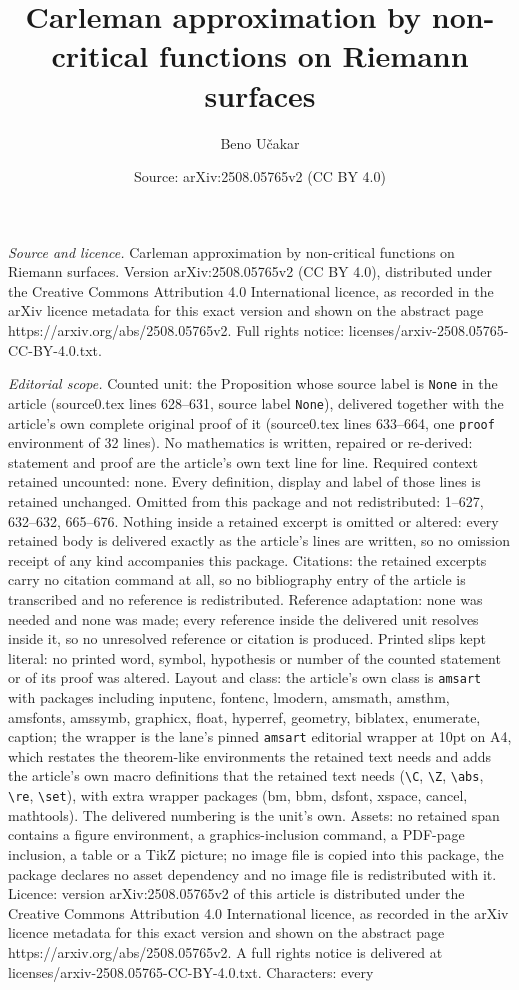 \documentclass[10pt,a4paper]{amsart}
\title[Carleman approximation by non-critical functions on Riemann ]{Carleman approximation by non-critical functions on Riemann surfaces}
\author{Beno U\v{c}akar}
\date{Source: arXiv:2508.05765v2 (CC BY 4.0)}
\begin{document}
\maketitle

\noindent\emph{Source and licence.} Carleman approximation by non-critical functions on Riemann surfaces. Version arXiv:2508.05765v2 (CC BY 4.0), distributed under the Creative Commons Attribution 4.0 International licence, as recorded in the arXiv licence metadata for this exact version and shown on the abstract page https://arxiv.org/abs/2508.05765v2. Full rights notice: licenses/arxiv-2508.05765-CC-BY-4.0.txt.\par\smallskip

\noindent\textit{Editorial scope.} Counted unit: the Proposition whose source label is \texttt{None} in the article (source0.tex lines 628--631, source label \texttt{None}), delivered together with the article's own complete original proof of it (source0.tex lines 633--664, one \texttt{proof} environment of 32 lines). No mathematics is written, repaired or re-derived: statement and proof are the article's own text line for line. Required context retained uncounted: none. Every definition, display and label of those lines is retained unchanged. Omitted from this package and not redistributed: 1--627, 632--632, 665--676. Nothing inside a retained excerpt is omitted or altered: every retained body is delivered exactly as the article's lines are written, so no omission receipt of any kind accompanies this package. Citations: the retained excerpts carry no citation command at all, so no bibliography entry of the article is transcribed and no reference is redistributed. Reference adaptation: none was needed and none was made; every reference inside the delivered unit resolves inside it, so no unresolved reference or citation is produced. Printed slips kept literal: no printed word, symbol, hypothesis or number of the counted statement or of its proof was altered. Layout and class: the article's own class is \texttt{amsart} with packages including inputenc, fontenc, lmodern, amsmath, amsthm, amsfonts, amssymb, graphicx, float, hyperref, geometry, biblatex, enumerate, caption; the wrapper is the lane's pinned \texttt{amsart} editorial wrapper at 10pt on A4, which restates the theorem-like environments the retained text needs and adds the article's own macro definitions that the retained text needs (\texttt{\textbackslash C}, \texttt{\textbackslash Z}, \texttt{\textbackslash abs}, \texttt{\textbackslash re}, \texttt{\textbackslash set}), with extra wrapper packages (bm, bbm, dsfont, xspace, cancel, mathtools). The delivered numbering is the unit's own. Assets: no retained span contains a figure environment, a graphics-inclusion command, a PDF-page inclusion, a table or a TikZ picture; no image file is copied into this package, the package declares no asset dependency and no image file is redistributed with it. Licence: version arXiv:2508.05765v2 of this article is distributed under the Creative Commons Attribution 4.0 International licence, as recorded in the arXiv licence metadata for this exact version and shown on the abstract page https://arxiv.org/abs/2508.05765v2. A full rights notice is delivered at licenses/arxiv-2508.05765-CC-BY-4.0.txt. Characters: every 
\end{document}

